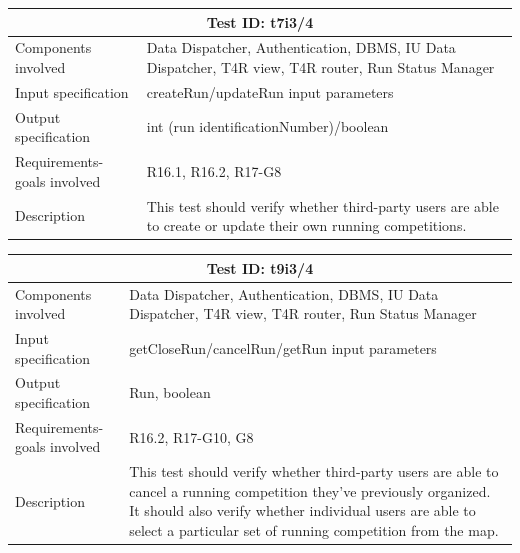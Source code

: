 \begin{table}[H]
\centering
\begin{tabular}{ |p{4.5cm}||p{11cm}|  }
 \hline
 \multicolumn{2}{|c|}{Test ID: t7i3/4} \\
 \hline 
 Components involved  	&    Data Dispatcher, Authentication, DBMS, IU Data Dispatcher, T4R view, T4R router, Run Status Manager\\
 Input specification  	&  	createRun/updateRun input parameters\\
Output specification  	& 	int (run identificationNumber)/boolean\\
Requirements-goals involved &  R16.1, R16.2, R17-G8\\
Description  	& 	 	    This test should verify whether third-party users are able to create or update their own running competitions.\\
 \hline
\end{tabular}
\end{table}
\begin{table}[H]
\centering
\begin{tabular}{ |p{4.5cm}||p{11cm}|  }
 \hline
 \multicolumn{2}{|c|}{Test ID: t9i3/4} \\
 \hline 
 Components involved  	&    Data Dispatcher, Authentication, DBMS, IU Data Dispatcher, T4R view, T4R router, Run Status Manager\\
 Input specification  	&  	  getCloseRun/cancelRun/getRun input parameters\\
Output specification  	& 	  Run, boolean\\
Requirements-goals involved &    R16.2, R17-G10, G8\\
Description  	& 	 	    This test should verify whether third-party users are able to cancel a running competition they've previously organized. It  should also verify whether individual users are able to select a particular set of running competition from the map. \\
 \hline
\end{tabular}
\end{table}
